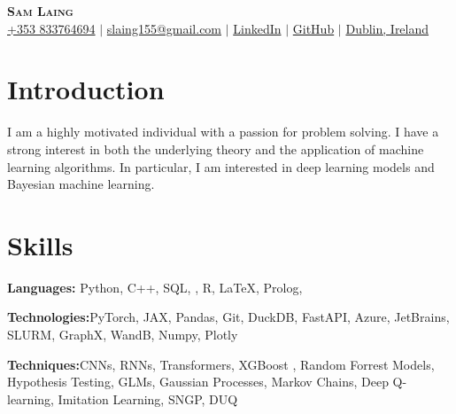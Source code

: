 \documentclass[letterpaper,11pt]{article}
\newcommand{\resumeSubHeadingListStart}{\begin{itemize}[leftmargin=0.15in, label={}]}
\newcommand{\resumeSubHeadingListEnd}{\end{itemize}}
\begin{document}

\begin{center}
    \textbf{\Huge \scshape Sam Laing} \\ \vspace{3pt}
    \small
    \faMobile \hspace{.5pt} \href{tel:353833764694}{+353 833764694}
    $|$
    \faAt \hspace{.5pt} \href{slaing155@gmail.com}{slaing155@gmail.com}
    $|$
    \faLinkedinSquare \hspace{.5pt} \href{https://www.linkedin.com/in/sam-laing-196403214}{LinkedIn}
    $|$
    \faGithub \hspace{.5pt} \href{https://github.com/}{GitHub}
    $|$
    \faMapMarker \hspace{.5pt} \href{https://www.google.com/maps/place/Dublin+Pearse/@53.3433306,-6.2505958,17z/data=!3m1!4b1!4m6!3m5!1s0x48670e9108066ca5:0x500d7bb07899f3d!8m2!3d53.3433274!4d-6.2480209!16s%2Fg%2F11bxg0m2g7?entry=ttu}{Dublin, Ireland}
\end{center}

\section{Introduction}
   I am a highly motivated individual with a passion for problem solving. I have a strong interest in both the underlying theory and the application of machine learning algorithms. In particular, I am interested in deep learning models and Bayesian machine learning.


\section{Skills}
  \vspace{2pt}
  \resumeSubHeadingListStart
    \small{\item{
        
        \textbf{Languages:}{ Python, C++, SQL, , R, \LaTeX, Prolog, } \\ \vspace{3pt}
        
        \textbf{Technologies:}{PyTorch, JAX, Pandas, Git, DuckDB, FastAPI, Azure, JetBrains, SLURM, GraphX, WandB, Numpy, Plotly} \\ \vspace{3pt}
        
	\textbf{Techniques:}{CNNs, RNNs, Transformers, XGBoost , Random Forrest Models, Hypothesis Testing, GLMs, Gaussian Processes, Markov Chains, Deep Q-learning, Imitation Learning, SNGP, DUQ  }
        
    }}
  \resumeSubHeadingListEnd
\end{document}
